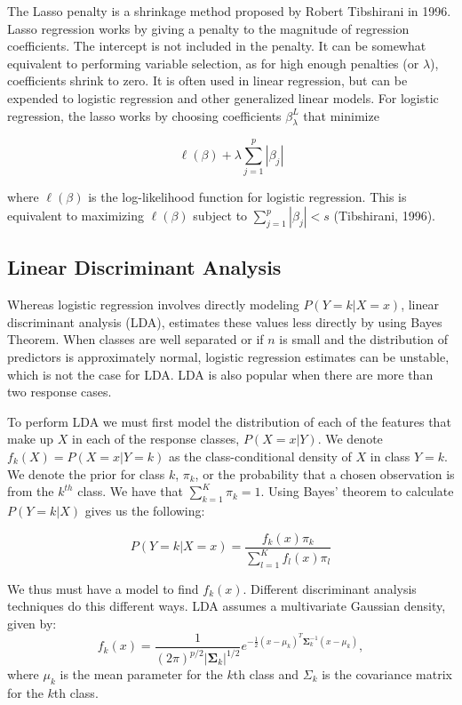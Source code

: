 \documentclass[12pt,twoside]{reedthesis}
\theoremstyle{definition}
\theoremstyle{definition}
\theoremstyle{definition}
\theoremstyle{remark}
\begin{document}
The Lasso penalty is a shrinkage method proposed by Robert Tibshirani in
1996. Lasso regression works by giving a penalty to the magnitude of
regression coefficients. The intercept is not included in the penalty.
It can be somewhat equivalent to performing variable selection, as for
high enough penalties (or \(\lambda\)), coefficients shrink to zero. It
is often used in linear regression, but can be expended to logistic
regression and other generalized linear models. For logistic regression,
the lasso works by choosing coefficients \(\beta_\lambda^L\) that
minimize

\[ \ell(\beta) + \lambda \sum_{j = 1}^p |\beta_j| \]

where \(\ell(\beta)\) is the log-likelihood function for logistic
regression. This is equivalent to maximizing \(\ell(\beta)\) subject to
\(\sum_{j=1}^p|\beta_j| < s\) (Tibshirani, 1996).

\subsection{Linear Discriminant
Analysis}\label{linear-discriminant-analysis}

Whereas logistic regression involves directly modeling
\(P(Y = k | X =x)\), linear discriminant analysis (LDA), estimates these
values less directly by using Bayes Theorem. When classes are well
separated or if \(n\) is small and the distribution of predictors is
approximately normal, logistic regression estimates can be unstable,
which is not the case for LDA. LDA is also popular when there are more
than two response cases.

To perform LDA we must first model the distribution of each of the
features that make up \(X\) in each of the response classes,
\(P(X = x|Y)\). We denote \(f_k(X) = P(X = x| Y = k)\) as the
class-conditional density of \(X\) in class \(Y = k\). We denote the
prior for class \(k\), \(\pi_k\), or the probability that a chosen
observation is from the \(k^{th}\) class. We have that
\(\sum_{k=1}^K \pi_k = 1\). Using Bayes' theorem to calculate
\(P(Y = k |X)\) gives us the following:

\[ P(Y = k | X = x) = \frac{f_k(x)\pi_k}{\sum_{l = 1}^Kf_l(x)\pi_l}\]

We thus must have a model to find \(f_k(x)\). Different discriminant
analysis techniques do this different ways. LDA assumes a multivariate
Gaussian density, given by:
\[f_k(x) = \frac{1}{(2\pi)^{p/2}|\mathbf{\Sigma}_k|^{1/2}}e^{-\frac{1}{2}(x-\mu_k)^T\mathbf{\Sigma}_k^{-1}(x - \mu_k)},\]
where \(\mu_k\) is the mean parameter for the \(k\)th class and
\(\Sigma_k\) is the covariance matrix for the \(k\)th class.
\end{document}
